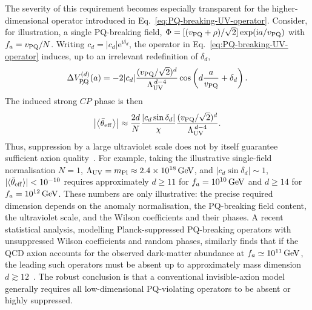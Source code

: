 \documentclass[review]{elsarticle}
\numberwithin{equation}{section}
\numberwithin{table}{section}
\numberwithin{figure}{section}
\def\i{\mathrm{i}}
\def\e{\mathrm{e}}
\begin{document}
The severity of this requirement becomes especially transparent for the higher-dimensional operator introduced in Eq.~\eqref{eq:PQ-breaking-UV-operator}. Consider, for illustration, a single PQ-breaking field, $\Phi=[(v_{\rm PQ}+\rho)/\sqrt{2}]\exp(\i a/v_{\rm PQ})$ with  $f_a=v_{\rm PQ}/N$. Writing $c_d=|c_d|\e^{\i\delta_d}$, the operator in Eq.~\eqref{eq:PQ-breaking-UV-operator} induces, up to an irrelevant redefinition of $\delta_d$,
\begin{align}
    \Delta V^{(d)}_{\slashed{\rm PQ}}(a)
    =
    -2|c_d|
    \frac{(v_{\rm PQ}/\sqrt{2})^d}
         {\Lambda_{\rm UV}^{\,d-4}}
    \cos\left(
        d\frac{a}{v_{\rm PQ}}+\delta_d
    \right).
    \label{eq:axion-quality-dim-d-potential}
\end{align}
The induced strong $CP$ phase is then
\begin{align}
    \left|
    \left\langle\bar\theta_{\rm eff}\right\rangle
    \right|
    \approx
    \frac{2d}{N}
    \frac{|c_d\sin\delta_d|}{\chi}
    \frac{(v_{\rm PQ}/\sqrt{2})^d}
         {\Lambda_{\rm UV}^{\,d-4}}.
    \label{eq:axion-quality-dim-d-shift}
\end{align}
Thus, suppression by a large ultraviolet scale does not by itself guarantee sufficient axion quality~\cite{Barr:1992qq,Holman:1992us,Kamionkowski:1992mf,Dobrescu:1996jp}. For example, taking the illustrative single-field normalisation $N=1$, $\Lambda_{\rm UV}= m_{\rm Pl}\approx 2.4\times10^{18}\,{\rm GeV}$, and $|c_d\sin\delta_d|\sim1$, $|\langle \bar{\theta}_{\rm eff}\rangle|<10^{-10}$ requires approximately $d\geq11$ for $f_a=10^{10}\,{\rm GeV}$ and $d\geq14$ for $f_a=10^{12}\,{\rm GeV}$. These numbers are only illustrative: the precise required dimension depends on the anomaly normalisation, the PQ-breaking field content, the ultraviolet scale, and the Wilson coefficients and their phases. A recent statistical analysis, modelling Planck-suppressed PQ-breaking operators with unsuppressed Wilson coefficients and random phases, similarly finds that if the QCD axion accounts for the observed dark-matter abundance at $f_a\simeq10^{11}\,{\rm GeV}$, the leading such operators must be absent up to approximately mass dimension $d\gtrsim12$~\cite{Cheek:2026dvu}. The robust conclusion is that a conventional invisible-axion model generally requires all low-dimensional PQ-violating operators to be absent or highly suppressed.
\end{document}
